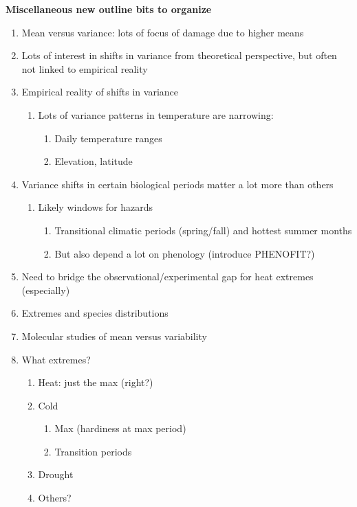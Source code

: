 \documentclass[11pt,letter]{article}
\begin{document}
{\bf Miscellaneous new outline bits to organize}
\begin{enumerate}
\item Mean versus variance: lots of focus of damage due to higher means
\item Lots of interest in shifts in variance from theoretical perspective, but often not linked to empirical reality
\item Empirical reality of shifts in variance
\begin{enumerate}
\item Lots of variance patterns in temperature are narrowing: 
\begin{enumerate}
\item Daily temperature ranges
\item Elevation, latitude
\end{enumerate}
\end{enumerate}
\item Variance shifts in certain biological periods matter a lot more than others
\begin{enumerate}
\item Likely windows for hazards 
\begin{enumerate}
\item Transitional climatic periods (spring/fall) and hottest summer months
\item But also depend a lot on phenology (introduce PHENOFIT?)
\end{enumerate}
\end{enumerate}
\item Need to bridge the observational/experimental gap for heat extremes (especially)
\item Extremes and species distributions
\item Molecular studies of mean versus variability 
\item What extremes?
\begin{enumerate}
\item Heat: just the max (right?)
\item Cold
\begin{enumerate}
\item Max (hardiness at max period) 
\item Transition periods
\end{enumerate}
\item Drought
\item Others?
\end{enumerate}
\end{enumerate}
\end{document}
